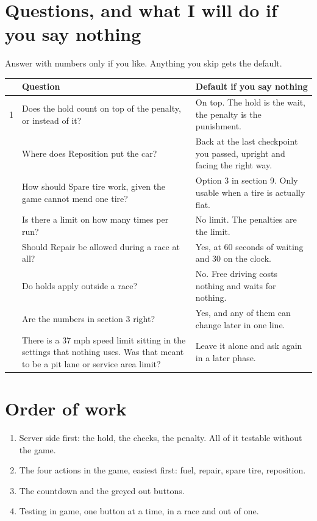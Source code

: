 \documentclass[11pt,a4paper]{article}
\begin{document}
\section{Questions, and what I will do if you say nothing}

Answer with numbers only if you like. Anything you skip gets the default.

\begin{longtable}{@{}p{6mm}p{74mm}p{72mm}@{}}
\toprule
& \textbf{Question} & \textbf{Default if you say nothing} \\
\midrule
\endhead
1 & Does the hold count on top of the penalty, or instead of it?
  & On top. The hold is the wait, the penalty is the punishment. \\
\addlinespace
2 & Where does Reposition put the car?
  & Back at the last checkpoint you passed, upright and facing the right way. \\
\addlinespace
3 & How should Spare tire work, given the game cannot mend one tire?
  & Option 3 in section 9. Only usable when a tire is actually flat. \\
\addlinespace
4 & Is there a limit on how many times per run?
  & No limit. The penalties are the limit. \\
\addlinespace
5 & Should Repair be allowed during a race at all?
  & Yes, at 60 seconds of waiting and 30 on the clock. \\
\addlinespace
6 & Do holds apply outside a race?
  & No. Free driving costs nothing and waits for nothing. \\
\addlinespace
7 & Are the numbers in section 3 right?
  & Yes, and any of them can change later in one line. \\
\addlinespace
8 & There is a 37 mph speed limit sitting in the settings that nothing uses.
    Was that meant to be a pit lane or service area limit?
  & Leave it alone and ask again in a later phase. \\
\bottomrule
\end{longtable}

\section{Order of work}

\begin{enumerate}
  \item Server side first: the hold, the checks, the penalty. All of it
        testable without the game.
  \item The four actions in the game, easiest first: fuel, repair, spare tire,
        reposition.
  \item The countdown and the greyed out buttons.
  \item Testing in game, one button at a time, in a race and out of one.
\end{enumerate}
\end{document}
